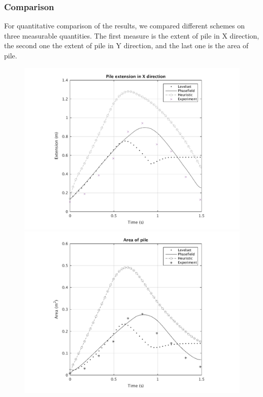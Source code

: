 \documentclass[letterpaper,10pt]{article}
\begin{document}
\subsubsection{Comparison}
For quantitative comparison of the results, we compared different schemes on three measurable quantities. The first measure is the extent of pile in X direction, the second one the extent of pile in Y direction, and the last one is the area of pile.
\begin{figure}[H]
        \begin{minipage}[b]{.48\linewidth}
                \centering
                \includegraphics[scale=0.48]{IMAGES/xextend.png}
                \includegraphics[scale=0.48]{IMAGES/area.png}

\end{minipage}
\end{figure}
\end{document}
